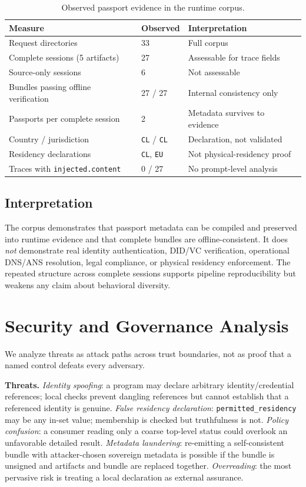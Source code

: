\documentclass[conference]{IEEEtran}
\newcommand{\code}[1]{\texttt{\small #1}}
\begin{document}
\begin{table}[t]
\centering
\caption{Observed passport evidence in the runtime corpus.}
\label{tab:obs}
\renewcommand{\arraystretch}{1.2}
\footnotesize
\begin{tabular}{@{}p{}p{}p{}@{}}
\toprule
\textbf{Measure} & \textbf{Observed} & \textbf{Interpretation} \\
\midrule
Request directories & 33 & Full corpus \\
Complete sessions (5 artifacts) & 27 & Assessable for trace fields \\
Source-only sessions & 6 & Not assessable \\
Bundles passing offline verification & 27 / 27 & Internal consistency only \\
Passports per complete session & 2 & Metadata survives to evidence \\
Country / jurisdiction & \code{CL} / \code{CL} & Declaration, not validated \\
Residency declarations & \code{CL}, \code{EU} & Not physical-residency proof \\
Traces with \code{injected.content} & 0 / 27 & No prompt-level analysis \\
\bottomrule
\end{tabular}
\end{table}

\subsection{Interpretation}
The corpus demonstrates that passport metadata can be compiled and preserved into
runtime evidence and that complete bundles are offline-consistent. It does
\emph{not} demonstrate real identity authentication, DID/VC verification,
operational DNS/ANS resolution, legal compliance, or physical residency
enforcement. The repeated structure across complete sessions supports pipeline
reproducibility but weakens any claim about behavioral diversity.

\section{Security and Governance Analysis}\label{sec:security}
We analyze threats as attack paths across trust boundaries, not as proof that a
named control defeats every adversary.

\noindent\textbf{Threats.} \emph{Identity spoofing}: a program may declare
arbitrary identity/credential references; local checks prevent dangling
references but cannot establish that a referenced identity is genuine.
\emph{False residency declaration}: \code{permitted\_residency} may be any in-set
value; membership is checked but truthfulness is not. \emph{Policy confusion}: a
consumer reading only a coarse top-level status could overlook an unfavorable
detailed result. \emph{Metadata laundering}: re-emitting a self-consistent bundle
with attacker-chosen sovereign metadata is possible if the bundle is unsigned and
artifacts and bundle are replaced together. \emph{Overreading}: the most
pervasive risk is treating a local declaration as external assurance.
\end{document}
